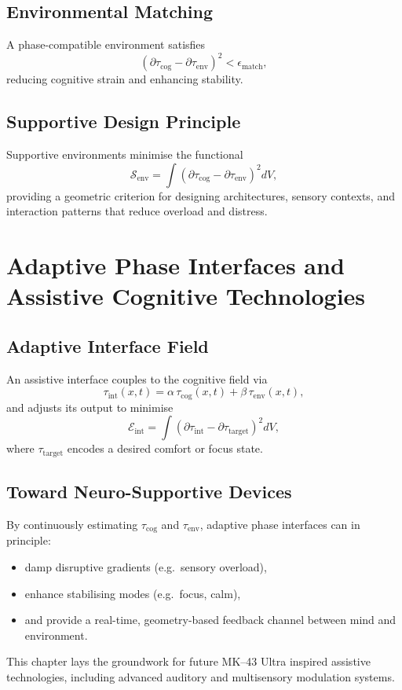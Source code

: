 \section{Environmental Matching}
A phase-compatible environment satisfies
\[
(\partial\tau_{\mathrm{cog}} - \partial\tau_{\mathrm{env}})^2 < \epsilon_{\mathrm{match}},
\]
reducing cognitive strain and enhancing stability.

\section{Supportive Design Principle}
Supportive environments minimise the functional
\[
\mathcal{S}_{\mathrm{env}} = \int (\partial\tau_{\mathrm{cog}} - \partial\tau_{\mathrm{env}})^2 dV,
\]
providing a geometric criterion for designing architectures, sensory contexts, and interaction patterns that reduce overload and distress.

\chapter{Adaptive Phase Interfaces and Assistive Cognitive Technologies}

\section{Adaptive Interface Field}
An assistive interface couples to the cognitive field via
\[
\tau_{\mathrm{int}}(x,t) = \alpha\,\tau_{\mathrm{cog}}(x,t) + \beta\,\tau_{\mathrm{env}}(x,t),
\]
and adjusts its output to minimise
\[
\mathcal{E}_{\mathrm{int}} = \int (\partial\tau_{\mathrm{int}} - \partial\tau_{\mathrm{target}})^2 dV,
\]
where \(\tau_{\mathrm{target}}\) encodes a desired comfort or focus state.

\section{Toward Neuro-Supportive Devices}
By continuously estimating \(\tau_{\mathrm{cog}}\) and \(\tau_{\mathrm{env}}\), adaptive phase interfaces can in principle:
\begin{itemize}
  \item damp disruptive gradients (e.g.\ sensory overload),
  \item enhance stabilising modes (e.g.\ focus, calm),
  \item and provide a real-time, geometry-based feedback channel between mind and environment.
\end{itemize}
This chapter lays the groundwork for future MK--43 Ultra inspired assistive technologies, including advanced auditory and multisensory modulation systems.
